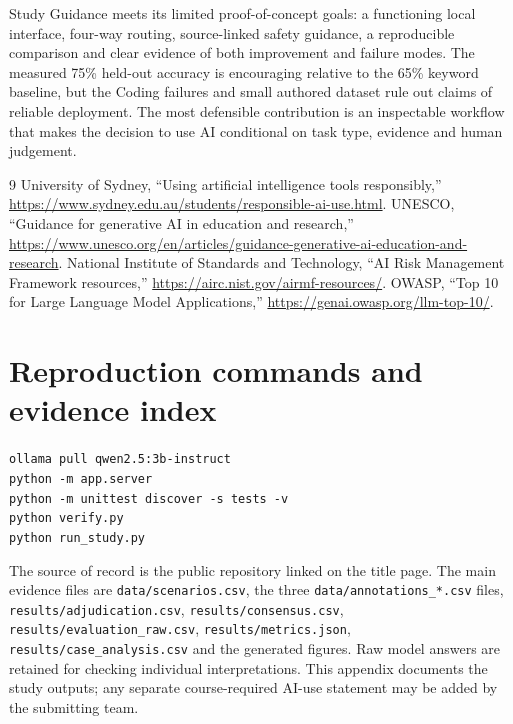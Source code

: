 \documentclass[11pt,a4paper]{article}
\begin{document}
Study Guidance meets its limited proof-of-concept goals: a functioning local interface, four-way routing, source-linked safety guidance, a reproducible comparison and clear evidence of both improvement and failure modes. The measured 75\% held-out accuracy is encouraging relative to the 65\% keyword baseline, but the Coding failures and small authored dataset rule out claims of reliable deployment. The most defensible contribution is an inspectable workflow that makes the decision to use AI conditional on task type, evidence and human judgement.

\begin{thebibliography}{9}\small
{} University of Sydney, ``Using artificial intelligence tools responsibly,'' \url{https://www.sydney.edu.au/students/responsible-ai-use.html}.
 UNESCO, ``Guidance for generative AI in education and research,'' \url{https://www.unesco.org/en/articles/guidance-generative-ai-education-and-research}.
 National Institute of Standards and Technology, ``AI Risk Management Framework resources,'' \url{https://airc.nist.gov/airmf-resources/}.
 OWASP, ``Top 10 for Large Language Model Applications,'' \url{https://genai.owasp.org/llm-top-10/}.
\end{thebibliography}
\appendix
\section{Reproduction commands and evidence index}
\small
\texttt{ollama pull qwen2.5:3b-instruct}\\
\texttt{python -m app.server}\\
\texttt{python -m unittest discover -s tests -v}\\
\texttt{python verify.py}\\
\texttt{python run\_study.py}

\sloppy The source of record is the public repository linked on the title page. The main evidence files are \texttt{data/scenarios.csv}, the three \texttt{data/annotations\_*.csv} files, \texttt{results/adjudication.csv}, \texttt{results/consensus.csv}, \texttt{results/evaluation\_raw.csv}, \texttt{results/metrics.json}, \texttt{results/case\_analysis.csv} and the generated figures. Raw model answers are retained for checking individual interpretations. This appendix documents the study outputs; any separate course-required AI-use statement may be added by the submitting team.
\end{document}
